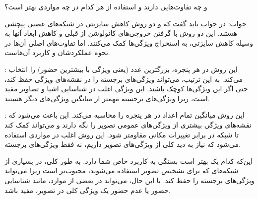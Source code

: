 و
چه تفاوت‌هایی دارند و استفاده از هر کدام در چه مواردی بهتر است؟

جواب:
در جواب باید گفت که
و 
دو روش کاهش سایزیتی در شبکه‌های عصبی پیچشی
هستند. این دو روش با گرفتن خروجی‌های کانولوشن از قبلی و کاهش ابعاد آنها به وسیله کاهش سایزتی، به استخراج ویژگی‌ها کمک می‌کنند. اما تفاوت‌های اصلی آن‌ها در نحوه عملکردشان و کاربرد آن‌هاست.

: این روش در هر پنجره، بزرگترین عدد (یعنی ویژگی با بیشترین حضور) را انتخاب می‌کند. به این ترتیب،
می‌تواند ویژگی‌های برجسته را در نقشه‌های ویژگی حفظ کند، حتی اگر این ویژگی‌ها کوچک باشند. این ویژگی اغلب در شناسایی اشیا و تصاویر مفید است، زیرا ویژگی‌های برجسته مهمتر از میانگین ویژگی‌های دیگر هستند.

: این روش میانگین تمام اعداد در هر پنجره را محاسبه می‌کند. این باعث می‌شود که نقشه‌های ویژگی بیشتری از ویژگی‌های عمومی تصویر را نگه دارند و می‌تواند کمک کند تا شبکه در برابر تغییرات مکانی مقاومتر شود. این روش اغلب در مواردی استفاده می‌شود که نیاز به دید کلی از ویژگی‌های تصویر داریم، نه فقط ویژگی‌های برجسته.

این‌که کدام یک بهتر است بستگی به کاربرد خاص شما دارد. به طور کلی،
در بسیاری از شبکه‌های
که برای تشخیص تصویر استفاده می‌شوند، محبوب‌تر است زیرا می‌تواند ویژگی‌های برجسته را حفظ کند. با این حال،
می‌تواند در بعضی از موارد، مانند شناسایی حضور یا عدم حضور یک ویژگی کلی در تصویر، مفید باشد.
